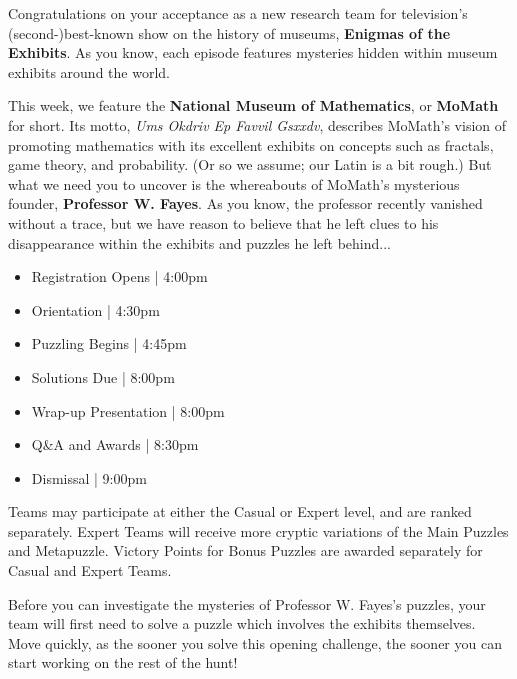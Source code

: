 

  Congratulations on your acceptance as a new research team for television's
  (second-)best-known show on the history of museums,
  \textbf{Enigmas of the Exhibits}. As you know, each episode features
  mysteries hidden within museum exhibits around the world.

  This week, we feature the
  \textbf{National Museum of Mathematics}, or \textbf{MoMath} for
  short. Its motto, \textit{Ums Okdriv Ep Favvil Gsxxdv}, describes MoMath's
  vision of promoting mathematics with its excellent exhibits on
  concepts such as fractals, game theory, and probability.
  (Or so we assume; our Latin is a bit rough.) But what we need
  you to uncover is the whereabouts of MoMath's mysterious founder,
  \textbf{Professor W. Fayes}. As you know, the professor
  recently vanished without
  a trace, but we have reason to believe that he left clues to his
  disappearance within the exhibits and puzzles he left behind...


\begin{itemize}
\item Registration Opens | 4:00pm
\item Orientation | 4:30pm
\item Puzzling Begins | 4:45pm
\item Solutions Due | 8:00pm
\item Wrap-up Presentation | 8:00pm
\item Q\&A and Awards | 8:30pm
\item Dismissal | 9:00pm
\end{itemize}


Teams may participate at either the Casual or Expert level, and are ranked
separately. Expert Teams will receive more cryptic variations of the Main
Puzzles and Metapuzzle. Victory Points for Bonus Puzzles are awarded
separately for Casual and Expert Teams.


Before you can investigate the mysteries of Professor W. Fayes's puzzles,
your team will first need to solve a puzzle which involves the
exhibits themselves. Move quickly, as the sooner you solve this opening
challenge, the sooner you can start working on the rest of the hunt!

